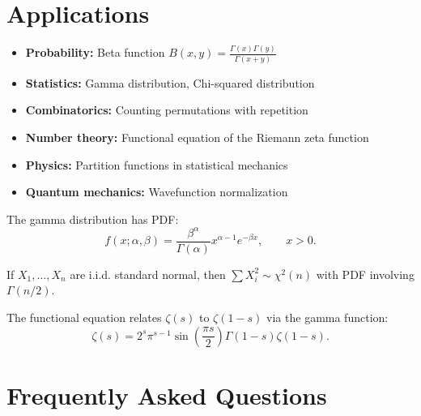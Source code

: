 \section{Applications}

\begin{itemize}
\item \textbf{Probability:} Beta function $B(x,y) = \frac{\Gamma(x)\Gamma(y)}{\Gamma(x+y)}$
\item \textbf{Statistics:} Gamma distribution, Chi-squared distribution
\item \textbf{Combinatorics:} Counting permutations with repetition
\item \textbf{Number theory:} Functional equation of the Riemann zeta function
\item \textbf{Physics:} Partition functions in statistical mechanics
\item \textbf{Quantum mechanics:} Wavefunction normalization
\end{itemize}

\begin{remark}
The gamma distribution has PDF:
\[
f(x; \alpha, \beta) = \frac{\beta^\alpha}{\Gamma(\alpha)} x^{\alpha-1} e^{-\beta x}, \qquad x > 0.
\]
\end{remark}

\begin{remark}
If $X_1, \ldots, X_n$ are i.i.d. standard normal, then $\sum X_i^2 \sim \chi^2(n)$ with PDF involving $\Gamma(n/2)$.
\end{remark}

\begin{remark}
The functional equation relates $\zeta(s)$ to $\zeta(1-s)$ via the gamma function:
\[
\zeta(s) = 2^s \pi^{s-1} \sin\left(\frac{\pi s}{2}\right) \Gamma(1-s) \zeta(1-s).
\]
\end{remark}

\section{Frequently Asked Questions}

